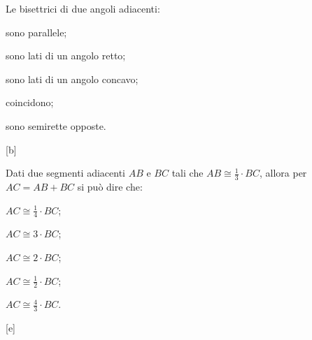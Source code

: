 \begin{esercizio}
\label{ese:1.69}
Le bisettrici di due angoli adiacenti:
\vspace{-.5em}
\begin{multicols}{2}
\begin{enumeratea}
\item sono parallele;
\item sono lati di un angolo retto;
\item sono lati di un angolo concavo;
\item coincidono;
\item sono semirette opposte.
\end{enumeratea}
\end{multicols}
\vspace{-18pt}
\hfill[b]
\end{esercizio}


\begin{esercizio}
\label{ese:1.71}
Dati due segmenti adiacenti \(AB\) e \(BC\) tali che \(AB\cong 
\frac{1}{3}\cdot BC\), allora per \(AC=AB+BC\) si può dire che:
\vspace{-.5em}
\begin{multicols}{3}
\begin{enumeratea}
\item \(AC\cong \frac{1}{4}\cdot BC\);
\item \(AC\cong 3\cdot BC\);
\item \(AC\cong 2\cdot BC\);
\item \(AC\cong \frac{1}{2}\cdot BC\);
\item \(AC\cong \frac{4}{3}\cdot BC\).
\end{enumeratea}
\end{multicols}
\vspace{-18pt}
\hfill[e]
\end{esercizio}

